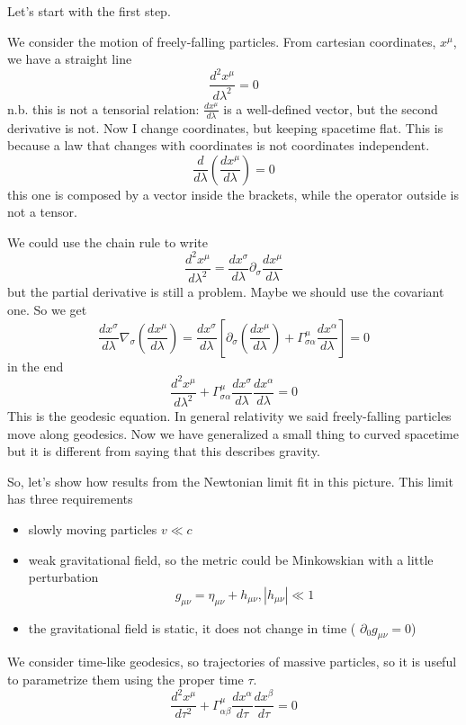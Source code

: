 Let's start with the first step. \par
We consider the motion of freely-falling particles. From cartesian coordinates, $x^{\mu }$, we have a straight line \[
\frac{d ^{2}x^{\mu }}{d \lambda ^{2}} = 0 
\]
n.b. this is not a tensorial relation: $\frac{d x^{\mu }}{d \lambda }$ is a well-defined vector, but the second derivative is not.
Now I change coordinates, but keeping spacetime flat. This is because a law that changes with coordinates is not coordinates independent.
\[
\frac{d }{d \lambda }\left( \frac{d x^{\mu }}{d \lambda } \right) = 0
\]
this one is composed by a vector inside the brackets, while the operator outside is not a tensor. \par
We could use the chain rule to write
\[
\frac{d ^{2}x^{\mu }}{d \lambda ^{2}} = \frac{d x^{\sigma }}{d \lambda }\partial_{\sigma }\frac{d x^{\mu }}{d \lambda }
\]
but the partial derivative is still a problem. Maybe we should use the covariant one.
So we get
\[
	\frac{d x^{\sigma }}{d \lambda }\nabla _{\sigma } \left( \frac{d x^{\mu }}{d \lambda } \right) = \frac{d x^{\sigma }}{d \lambda }\left[ \partial_{\sigma } \left( \frac{d x^{\mu }}{d \lambda } \right) + \Gamma ^{\mu }_{\sigma \alpha } \frac{d x^{\alpha }}{d \lambda }\right] = 0
\]
in the end
\[
\frac{d ^{2}x^{\mu }}{d \lambda ^{2}} + \Gamma ^{\mu }_{\sigma \alpha }\frac{d x^{\sigma }}{d \lambda }\frac{d x^{\alpha }}{d \lambda } = 0
\]
This is the geodesic equation. In general relativity we said freely-falling particles move along geodesics. Now we have generalized a small thing to curved spacetime but it is different from saying that this describes gravity.\par
So, let's show how results from the Newtonian limit fit in this picture. This limit has three requirements
\begin{itemize}
\item slowly moving particles $v \ll c$
\item weak gravitational field, so the metric could be Minkowskian with a little perturbation
	\[
		g_{\mu \nu } = \eta _{\mu \nu } + h_{\mu \nu }, |h_{\mu \nu }|\ll 1
	\]
\item the gravitational field is static, it does not change in time ( $\partial_{0}g_{\mu \nu } = 0$)
\end{itemize}
We consider time-like geodesics, so trajectories of massive particles, so it is useful to parametrize them using the proper time $\tau $.
\[
\frac{d ^{2}x^{\mu }}{d \tau ^{2}} + \Gamma ^{\mu }_{\alpha  \beta } \frac{d x^{\alpha }}{d \tau }\frac{d x^{\beta }}{d \tau } = 0
\]
